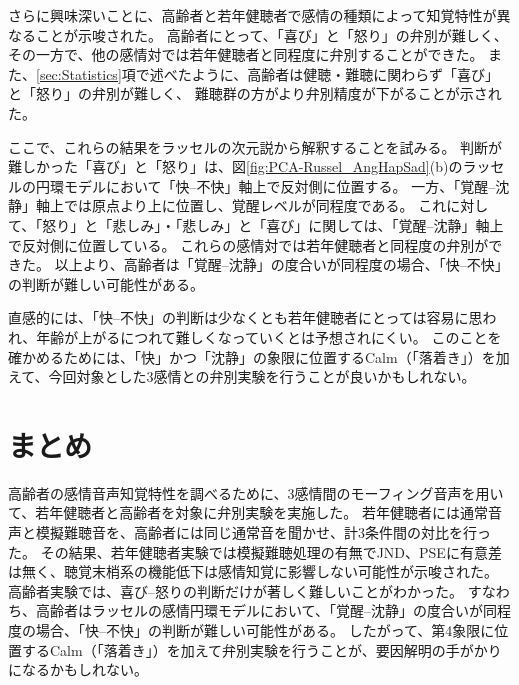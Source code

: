 さらに興味深いことに、高齢者と若年健聴者で感情の種類によって知覚特性が異なることが示唆された。
高齢者にとって、「喜び」と「怒り」の弁別が難しく、その一方で、他の感情対では若年健聴者と同程度に弁別することができた。
また、\ref{sec:Statistics}項で述べたように、高齢者は健聴・難聴に関わらず「喜び」と「怒り」の弁別が難しく、
難聴群の方がより弁別精度が下がることが示された。

ここで、これらの結果をラッセルの次元説\cite{russell1980circumplex}から解釈することを試みる。
判断が難しかった「喜び」と「怒り」は、図\ref{fig:PCA-Russel_AngHapSad}(b)のラッセルの円環モデルにおいて「快--不快」軸上で反対側に位置する。
一方、「覚醒--沈静」軸上では原点より上に位置し、覚醒レベルが同程度である。
これに対して、「怒り」と「悲しみ」・「悲しみ」と「喜び」に関しては、「覚醒--沈静」軸上で反対側に位置している。
これらの感情対では若年健聴者と同程度の弁別ができた。
以上より、高齢者は「覚醒--沈静」の度合いが同程度の場合、「快--不快」の判断が難しい可能性がある。

直感的には、「快--不快」の判断は少なくとも若年健聴者にとっては容易に思われ、年齢が上がるにつれて難しくなっていくとは予想されにくい。
このことを確かめるためには、「快」かつ「沈静」の象限に位置するCalm（「落着き」）を加えて、今回対象とした3感情との弁別実験を行うことが良いかもしれない。



\section{まとめ}
高齢者の感情音声知覚特性を調べるために、3感情間のモーフィング音声を用いて、若年健聴者と高齢者を対象に弁別実験を実施した。
若年健聴者には通常音声と模擬難聴音を、高齢者には同じ通常音を聞かせ、計3条件間の対比を行った。
その結果、若年健聴者実験では模擬難聴処理の有無でJND、PSEに有意差は無く、聴覚末梢系の機能低下は感情知覚に影響しない可能性が示唆された。
高齢者実験では、喜び--怒りの判断だけが著しく難しいことがわかった。
すなわち、高齢者はラッセルの感情円環モデル\cite{russell1980circumplex}において、「覚醒--沈静」の度合いが同程度の場合、「快--不快」の判断が難しい可能性がある。
したがって、第4象限に位置するCalm（「落着き」）を加えて弁別実験を行うことが、要因解明の手がかりになるかもしれない。

